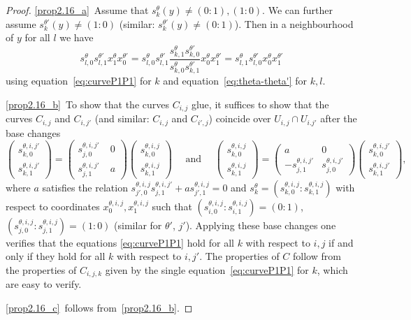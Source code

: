 \documentclass[ALCO,ThmDefs,Unicode,epreuves]{cedram}
\begin{document}
\begin{proof}
\ref{prop2.16_a}~Assume that $s^\theta_k(y)\neq(0:1),(1:0)$. We can further assume 
$s^{\theta'}_k(y)\neq(1:0)$ (similar: $s^{\theta'}_k(y)\neq(0:1)$). 
Then in a neighbourhood of $y$ for all $l$ we have
\[\textstyle
s^\theta_{l,0}s^{\theta'}_{l,1}x^\theta_1x^{\theta'}_0
=s^\theta_{l,0}s^{\theta'}_{l,1}
\frac{s^\theta_{k,1}s^{\theta'}_{k,0}}{s^\theta_{k,0}s^{\theta'}_{k,1}}
x^\theta_0x^{\theta'}_1
=s^\theta_{l,1}s^{\theta'}_{l,0}x^\theta_0x^{\theta'}_1
\]
using equation~\eqref{eq:curveP1P1} for $k$ and equation~\eqref{eq:theta-theta'} 
for $k,l$.

\ref{prop2.16_b}~To show that the curves $C_{i,j}$ glue, it suffices to show that
the curves $C_{i,j}$ and $C_{i,j'}$ (and similar: $C_{i,j}$ and $C_{i',j}$)
coincide over $U_{i,j}\cap U_{i.j'}$ after the base changes %
\[
\left(\begin{matrix}s^{\theta,i,j'}_{k,0}\\s^{\theta,i,j'}_{k,1}
\end{matrix}\right)
=\left(\begin{matrix}s^{\theta,i,j'}_{j,0}&\;0\\s^{\theta,i,j'}_{j,1}&\;a
\end{matrix}\right)
\left(\begin{matrix}s^{\theta,i,j}_{k,0}\\s^{\theta,i,j}_{k,1}
\end{matrix}\right)\quad 
\text{ and }
\quad
\left(\begin{matrix}s^{\theta,i,j}_{k,0}\\s^{\theta,i,j}_{k,1}
\end{matrix}\right)
=\left(\begin{matrix}a&0\\[1mm]-s^{\theta,i,j'}_{j,1}&s^{\theta,i,j'}_{j,0}
\end{matrix}\right)
\left(\begin{matrix}s^{\theta,i,j'}_{k,0}\\s^{\theta,i,j'}_{k,1}
\end{matrix}\right),
\]
where $a$ satisfies the relation 
$s^{\theta,i,j}_{j',0}s^{\theta,i,j'}_{j,1}+as^{\theta,i,j}_{j',1}=0$
and $s^\theta_k=(s^{\theta,i,j}_{k,0}:s^{\theta,i,j}_{k,1})$
with respect to coordinates $x_0^{\theta,i,j},x_1^{\theta,i,j}$
such that $(s^{\theta,i,j}_{i,0}:s^{\theta,i,j}_{i,1})=(0:1)$,
$(s^{\theta,i,j}_{j,0}:s^{\theta,i,j}_{j,1})=(1:0)$ (similar for $\theta'$, $j'$).
Applying these base changes one verifies that the equations 
\eqref{eq:curveP1P1} hold for all $k$ with respect to $i,j$ 
if and only if they hold for all $k$ with respect to $i,j'$. 
The properties of $C$ follow from the properties of $C_{i,j,k}$ 
given by the single equation~\eqref{eq:curveP1P1} for $k$, 
which are easy to verify.%

\ref{prop2.16_c}~follows from~\ref{prop2.16_b}.
\end{proof}
\end{document}
